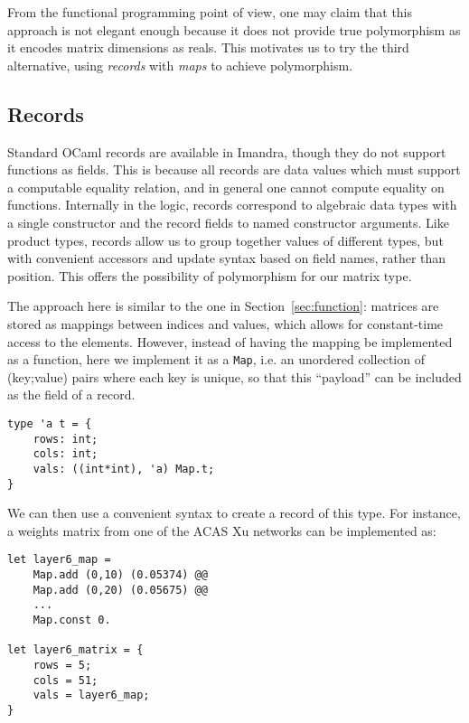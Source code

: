 \documentclass[runningheads]{llncs}
\newcommand{\knote}[1]{\todo[inline, color=blue!20]{#1}}
\begin{document}
From the functional programming point of view, one may claim that this approach is not elegant enough because
it does not provide true polymorphism as it encodes matrix dimensions as reals.
This motivates us to try the third alternative, using \emph{records} with \emph{maps} to achieve polymorphism.

\subsection{Records}

Standard OCaml records are available in Imandra, though they do not support functions as fields. This is because all records are data values which must support a computable equality relation, and in general one cannot compute equality on functions. Internally in the logic, records correspond to algebraic data types with a single constructor and the record fields to named constructor arguments. Like product types, records allow us to group together values of different types, but with convenient accessors and update syntax based on field names, rather than position. This offers the possibility of polymorphism for our matrix type. 

The approach here is similar to the one in Section~\ref{sec:function}: matrices are stored as mappings between indices and values, which allows for constant-time access to the elements. However, instead of having the mapping be implemented as a function, here we implement it as a \lstinline{Map}, i.e. an unordered collection of (key;value) pairs where each key is unique, so that this ``payload'' can be included as the field of a record. 

\begin{lstlisting}[language=caml]
type 'a t = {
	rows: int;
	cols: int;
	vals: ((int*int), 'a) Map.t;
}
\end{lstlisting}

We can then use a convenient syntax to create a record of this type. For instance, a weights matrix from one of the ACAS Xu networks can be implemented as:

\begin{lstlisting}[language=caml]
let layer6_map =
	Map.add (0,10) (0.05374) @@
	Map.add (0,20) (0.05675) @@
	...
	Map.const 0.

let layer6_matrix = {
	rows = 5;
	cols = 51;
	vals = layer6_map;
}
\end{lstlisting}
\end{document}
